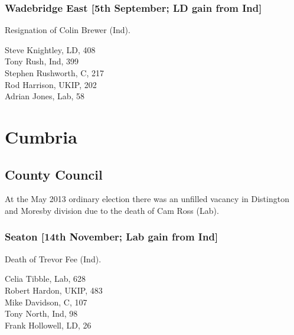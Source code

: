 \documentclass[a4paper,openany,10pt]{book}
\begin{document}
\subsubsection*{Wadebridge East \hspace*{\fill}\nolinebreak[1]%
\enspace\hspace*{\fill}
[5th September; LD gain from Ind]}


Resignation of Colin Brewer (Ind).



Steve Knightley, LD, 408\\
Tony Rush, Ind, 399\\
Stephen Rushworth, C, 217\\
Rod Harrison, UKIP, 202\\
Adrian Jones, Lab, 58\\


\vfill

\section{Cumbria}

\subsection*{County Council}

At the May 2013 ordinary election there was an unfilled vacancy in Distington and Moresby division due to the death of Cam Ross (Lab).


\subsubsection*{Seaton \hspace*{\fill}\nolinebreak[1]%
\enspace\hspace*{\fill}
[14th November; Lab gain from Ind]}


Death of Trevor Fee (Ind).



Celia Tibble, Lab, 628\\
Robert Hardon, UKIP, 483\\
Mike Davidson, C, 107\\
Tony North, Ind, 98\\
Frank Hollowell, LD, 26\\
\end{document}
